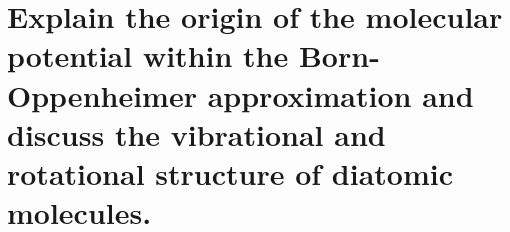 \section[Molekylepotential i Born-Oppenheimerapproks.]{Explain the origin of the molecular potential within the Born-Oppenheimer approximation and discuss the vibrational and rotational structure of diatomic molecules.}

\noindent
\Large

\normalsize
